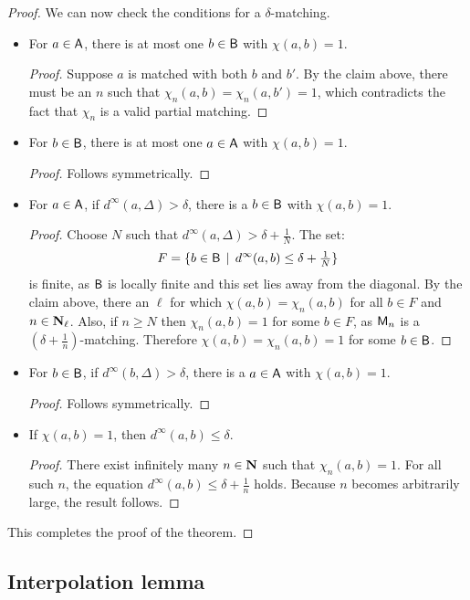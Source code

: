 \begin{proof}
We can now check the conditions for a $\delta$-matching.
\begin{itemize}
\item For $a \in \mathsf{A}$, there is at most one $b \in \mathsf{B}$ with $\chi(a, b) = 1$.
\begin{proof}
Suppose $a$ is matched with both $b$ and $b'$. By the claim above, there must be an $n$ such that $\chi_n(a, b) = \chi_n(a, b') = 1$, which contradicts the fact that $\chi_n$ is a valid partial matching.
\end{proof}
\item For $b \in \mathsf{B}$, there is at most one $a \in \mathsf{A}$ with $\chi(a, b) = 1$.
\begin{proof}
Follows symmetrically.
\end{proof}
\item For $a \in \mathsf{A}$, if $d^\infty(a, \Delta) > \delta$, there is a $b \in \mathsf{B}$ with $\chi(a, b) = 1$.
\begin{proof}
Choose $N$ such that $d^\infty(a, \Delta) > \delta + \tfrac{1}{N}$. The set:
\begin{align*}
F = \{b \in \mathsf{B} \, \mid \, d^\infty(a, b) \leq \delta + \tfrac{1}{N} \}
\end{align*}
is finite, as $\mathsf{B}$ is locally finite and this set lies away from the diagonal. By the claim above, there an $\ell$ for which $\chi(a, b) = \chi_n(a, b)$ for all $b \in F$ and $n \in \mathbf{N}_\ell$. Also, if $n \geq N$ then $\chi_n(a, b) = 1$ for some $b \in F$, as $\mathsf{M}_n$ is a $(\delta + \tfrac{1}{n})$-matching. Therefore $\chi(a, b) = \chi_n(a, b) = 1$ for some $b \in \mathsf{B}$.
\end{proof}
\item For $b \in \mathsf{B}$, if $d^\infty(b, \Delta) > \delta$, there is a $a \in \mathsf{A}$ with $\chi(a, b) = 1$.
\begin{proof}
Follows symmetrically.
\end{proof}
\item If $\chi(a, b) = 1$, then $d^\infty(a, b) \leq \delta$.
\begin{proof}
There exist infinitely many $n \in \mathbf{N}$ such that $\chi_n(a, b) = 1$. For all such $n$, the equation $d^\infty(a, b) \leq \delta + \tfrac{1}{n}$ holds. Because $n$ becomes arbitrarily large, the result follows.
\end{proof}
\end{itemize}

This completes the proof of the theorem.
\end{proof}

\subsection{Interpolation lemma}

